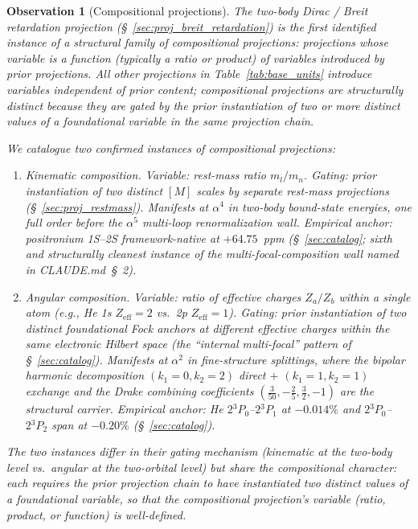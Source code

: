 \documentclass[11pt]{article}
\newtheorem{observation}{Observation}
\begin{document}
\begin{observation}[Compositional projections]
\label{obs:composition}
The two-body Dirac / Breit retardation projection
(\S~\ref{sec:proj_breit_retardation}) is the first identified
instance of a structural family of \emph{compositional projections}:
projections whose variable is a function (typically a ratio or
product) of variables introduced by prior projections.  All other
projections in Table~\ref{tab:base_units} introduce variables
independent of prior content; compositional projections are
structurally distinct because they are \emph{gated} by the prior
instantiation of two or more distinct values of a foundational
variable in the same projection chain.

We catalogue two confirmed instances of compositional projections:

\begin{enumerate}\setlength\itemsep{0pt}
\item \emph{Kinematic composition.}  Variable: rest-mass ratio
$m_l / m_n$.  Gating: prior instantiation of two distinct $[M]$
scales by separate rest-mass projections (\S~\ref{sec:proj_restmass}).
Manifests at $\alpha^4$ in two-body bound-state energies, one full
order before the $\alpha^5$ multi-loop renormalization wall.
Empirical anchor: positronium 1S--2S framework-native at
$+64.75$~ppm (\S~\ref{sec:catalog}; sixth and structurally cleanest
instance of the multi-focal-composition wall named in
CLAUDE.md~\S~2).

\item \emph{Angular composition.}  Variable: ratio of effective
charges $Z_a / Z_b$ within a single atom (e.g., He 1s
$Z_\text{eff} = 2$ vs.\ 2p $Z_\text{eff} = 1$).  Gating: prior
instantiation of two distinct foundational Fock anchors at different
effective charges within the same electronic Hilbert space (the
``internal multi-focal'' pattern of \S~\ref{sec:catalog}).
Manifests at $\alpha^2$ in fine-structure splittings, where the
bipolar harmonic decomposition $(k_1{=}0, k_2{=}2)$ direct $+$
$(k_1{=}1, k_2{=}1)$ exchange and the Drake combining coefficients
$(\tfrac{3}{50}, -\tfrac{2}{5}, \tfrac{3}{2}, -1)$ are the
structural carrier.  Empirical anchor: He $2{}^3P_0$--$2{}^3P_1$
at $-0.014\%$ and $2{}^3P_0$--$2{}^3P_2$ span at $-0.20\%$
(\S~\ref{sec:catalog}).
\end{enumerate}

The two instances differ in their gating mechanism (kinematic at
the two-body level vs.\ angular at the two-orbital level) but share
the compositional character: each requires the prior projection
chain to have instantiated two distinct values of a foundational
variable, so that the compositional projection's variable (ratio,
product, or function) is well-defined.


\end{observation}
\end{document}
